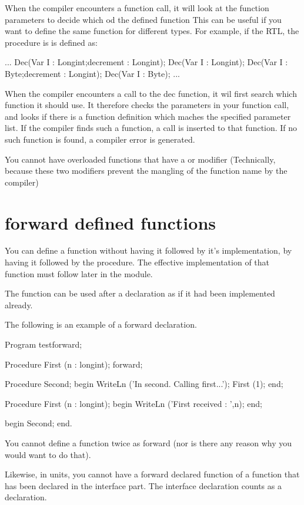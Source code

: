\documentclass{report}
\begin{document}
When the compiler encounters a function call, it will look at the function
parameters to decide which od the defined function
This can be useful if you want to define the same function for different
types. For example, if the RTL, the   procedure is
is defined as:
\begin{listing}
...
Dec(Var I : Longint;decrement : Longint);
Dec(Var I : Longint);
Dec(Var I : Byte;decrement : Longint);
Dec(Var I : Byte);
...
\end{listing}
When the compiler encounters a call to the dec function, it wil first search
which function it should use. It therefore checks the parameters in your
function call, and looks if there is a function definition which maches the
specified parameter list. If the compiler finds such a function, a call is
inserted to that function. If no such function is found, a compiler error is
generated.

You cannot have overloaded functions that have a  or 
modifier (Technically, because these two modifiers prevent the mangling of 
the function name by the compiler)

\section{forward defined functions}

You can define a function without having it followed by it's implementation,
by having it followed by the  procedure. The effective 
implementation of that function must follow later in the module.

The function can be used after a  declaration as if it had been
implemented already.

The following is an example of a forward declaration.
\begin{listing}
Program testforward;

Procedure First (n : longint); forward;

Procedure Second;
begin
  WriteLn ('In second. Calling first...');
  First (1);
end;

Procedure First (n : longint);
begin
  WriteLn ('First received : ',n);
end;

begin
  Second;
end.
\end{listing}

You cannot define a function twice as forward (nor is there any reason why
you would want to do that).

Likewise, in units, you cannot have a forward declared function of a 
function that has been declared in the interface part. The interface 
declaration counts as a  declaration.
\end{document}
